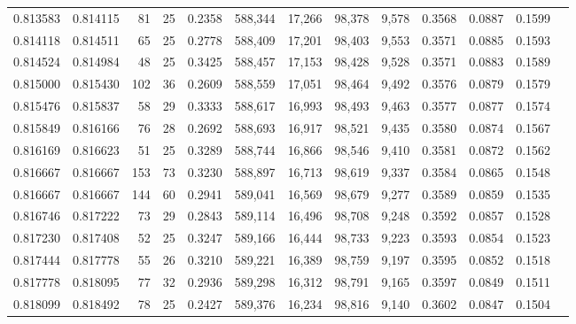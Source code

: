 \begin{tabular}{rrrrrrrrrrrrr}
0.813583 & 0.814115 &     81 &    25 &                                     0.2358 & 588,344 &  17,266 &  98,378 &   9,578 & 0.3568 & 0.0887 & 0.1599 \\
0.814118 & 0.814511 &     65 &    25 &                                     0.2778 & 588,409 &  17,201 &  98,403 &   9,553 & 0.3571 & 0.0885 & 0.1593 \\
0.814524 & 0.814984 &     48 &    25 &                                     0.3425 & 588,457 &  17,153 &  98,428 &   9,528 & 0.3571 & 0.0883 & 0.1589 \\
0.815000 & 0.815430 &    102 &    36 &                                     0.2609 & 588,559 &  17,051 &  98,464 &   9,492 & 0.3576 & 0.0879 & 0.1579 \\
0.815476 & 0.815837 &     58 &    29 &                                     0.3333 & 588,617 &  16,993 &  98,493 &   9,463 & 0.3577 & 0.0877 & 0.1574 \\
0.815849 & 0.816166 &     76 &    28 &                                     0.2692 & 588,693 &  16,917 &  98,521 &   9,435 & 0.3580 & 0.0874 & 0.1567 \\
0.816169 & 0.816623 &     51 &    25 &                                     0.3289 & 588,744 &  16,866 &  98,546 &   9,410 & 0.3581 & 0.0872 & 0.1562 \\
0.816667 & 0.816667 &    153 &    73 &                                     0.3230 & 588,897 &  16,713 &  98,619 &   9,337 & 0.3584 & 0.0865 & 0.1548 \\
0.816667 & 0.816667 &    144 &    60 &                                     0.2941 & 589,041 &  16,569 &  98,679 &   9,277 & 0.3589 & 0.0859 & 0.1535 \\
0.816746 & 0.817222 &     73 &    29 &                                     0.2843 & 589,114 &  16,496 &  98,708 &   9,248 & 0.3592 & 0.0857 & 0.1528 \\
0.817230 & 0.817408 &     52 &    25 &                                     0.3247 & 589,166 &  16,444 &  98,733 &   9,223 & 0.3593 & 0.0854 & 0.1523 \\
0.817444 & 0.817778 &     55 &    26 &                                     0.3210 & 589,221 &  16,389 &  98,759 &   9,197 & 0.3595 & 0.0852 & 0.1518 \\
0.817778 & 0.818095 &     77 &    32 &                                     0.2936 & 589,298 &  16,312 &  98,791 &   9,165 & 0.3597 & 0.0849 & 0.1511 \\
0.818099 & 0.818492 &     78 &    25 &                                     0.2427 & 589,376 &  16,234 &  98,816 &   9,140 & 0.3602 & 0.0847 & 0.1504 \\

\end{tabular}
